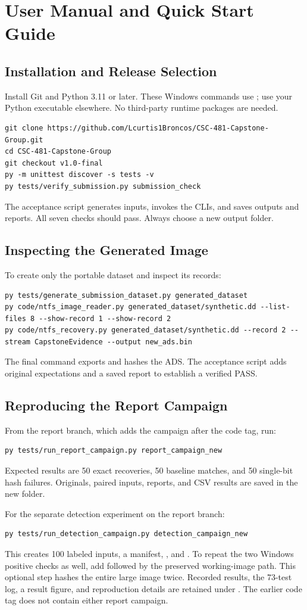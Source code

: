 \chapter{User Manual and Quick Start Guide}
\section{Installation and Release Selection}
Install Git and Python 3.11 or later. These Windows commands use ;
use your Python executable elsewhere. No third-party runtime packages are needed.
\begin{lstlisting}
git clone https://github.com/Lcurtis1Broncos/CSC-481-Capstone-Group.git
cd CSC-481-Capstone-Group
git checkout v1.0-final
py -m unittest discover -s tests -v
py tests/verify_submission.py submission_check
\end{lstlisting}
The acceptance script generates inputs, invokes the CLIs, and saves outputs
and reports. All seven checks should pass. Always choose a new output folder.

\section{Inspecting the Generated Image}
To create only the portable dataset and inspect its records:
\begin{lstlisting}
py tests/generate_submission_dataset.py generated_dataset
py code/ntfs_image_reader.py generated_dataset/synthetic.dd --list-files 8 --show-record 1 --show-record 2
py code/ntfs_recovery.py generated_dataset/synthetic.dd --record 2 --stream CapstoneEvidence --output new_ads.bin
\end{lstlisting}
The final command exports and hashes the ADS. The acceptance script adds
original expectations and a saved report to establish a verified PASS.

\section{Reproducing the Report Campaign}
From the report branch, which adds the campaign after the code tag, run:
\begin{lstlisting}
py tests/run_report_campaign.py report_campaign_new
\end{lstlisting}
Expected results are 50 exact recoveries, 50 baseline matches, and 50
single-bit hash failures. Originals, paired inputs, reports, and CSV results
are saved in the new folder.

For the separate detection experiment on the report branch:
\begin{lstlisting}
py tests/run_detection_campaign.py detection_campaign_new
\end{lstlisting}
This creates 100 labeled inputs, a manifest, , and
. To repeat the two Windows positive checks as well,
add  followed by the preserved working-image path.
This optional step hashes the entire large image twice. Recorded results,
the 73-test log, a result figure, and reproduction details are retained under
. The earlier code tag does not
contain either report campaign.

